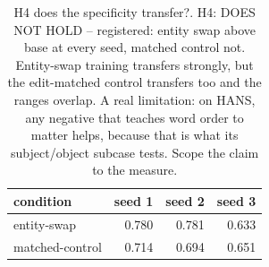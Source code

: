 \begin{table}[t]
\centering
\small
\caption{H4  does the specificity transfer?. H4: DOES NOT HOLD -- registered: entity swap above base at every seed, matched control not. Entity-swap training transfers strongly, but the edit-matched control transfers too and the ranges overlap. A real limitation: on HANS, any negative that teaches word order to matter helps, because that is what its subject/object subcase tests. Scope the claim to the measure.}
\begin{tabular}{lrrr}
\toprule
condition & seed 1 & seed 2 & seed 3 \\
\midrule
entity-swap & 0.780 & 0.781 & 0.633 \\
matched-control & 0.714 & 0.694 & 0.651 \\
\bottomrule
\end{tabular}
\end{table}

